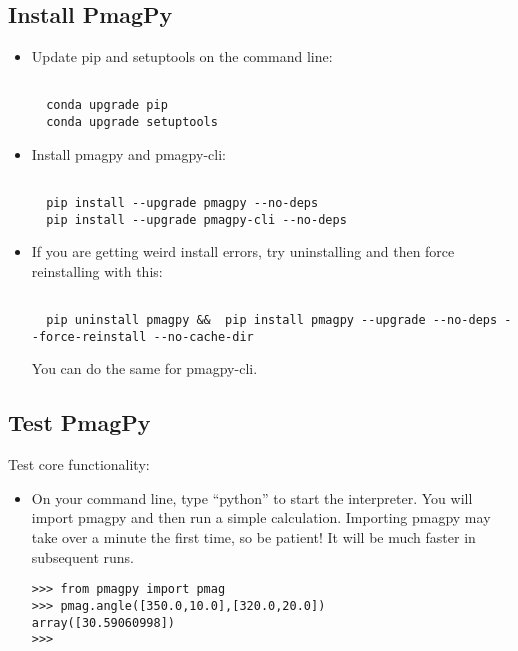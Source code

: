 \documentclass[11pt]{article}
\begin{document}
\subsection{Install PmagPy}


\begin{itemize}
     \item Update pip and setuptools on the command line:

\begin{verbatim}

  conda upgrade pip
  conda upgrade setuptools
\end{verbatim}
\item Install pmagpy and pmagpy-cli:

\begin{verbatim}

  pip install --upgrade pmagpy --no-deps
  pip install --upgrade pmagpy-cli --no-deps
\end{verbatim}
     \item If you are getting weird install errors, try uninstalling and then force reinstalling with this:

\begin{verbatim}

  pip uninstall pmagpy &&  pip install pmagpy --upgrade --no-deps --force-reinstall --no-cache-dir
\end{verbatim}

You can do the same for pmagpy-cli.
   \end{itemize}

\subsection{Test PmagPy}

Test core functionality:

\begin{itemize}
  \item On your command line, type ``python'' to start the interpreter.  You will import pmagpy and then run a simple calculation.  Importing pmagpy may take over a minute the first time, so be patient!  It will be much faster in subsequent runs.

\begin{verbatim}
>>> from pmagpy import pmag
>>> pmag.angle([350.0,10.0],[320.0,20.0])
array([30.59060998])
>>>
\end{verbatim}

\end{itemize}
\end{document}
